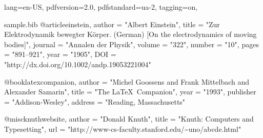 \ifdefined\Uchar\RequirePackage{luatagging}\fi
\DocumentMetadata
  {
    lang=en-US,
    pdfversion=2.0,
    pdfstandard=ua-2,
    tagging=on,
  }
\begin{filecontents}[overwrite]{sample.bib}
@article{einstein,
  author =       "Albert Einstein",
  title =        "{Zur Elektrodynamik bewegter K{\"o}rper}. ({German})
                 [{On} the electrodynamics of moving bodies]",
  journal =      "Annalen der Physik",
  volume =       "322",
  number =       "10",
  pages =        "891--921",
  year =         "1905",
  DOI =          "http://dx.doi.org/10.1002/andp.19053221004"
}

@book{latexcompanion,
    author    = "Michel Goossens and Frank Mittelbach and Alexander Samarin",
    title     = "The \LaTeX\ Companion",
    year      = "1993",
    publisher = "Addison-Wesley",
    address   = "Reading, Massachusetts"
}
 
@misc{knuthwebsite,
    author    = "Donald Knuth",
    title     = "Knuth: Computers and Typesetting",
    url       = "http://www-cs-faculty.stanford.edu/\~{}uno/abcde.html"
}
\end{filecontents}

\documentclass{article}
\usepackage{natbib}
\usepackage{har2nat}
\usepackage{hyperref}



text \cite{einstein}

As  and  describe \ldots

manuals  describe \ldots

\citeyear{latexcompanion}


\medskip







